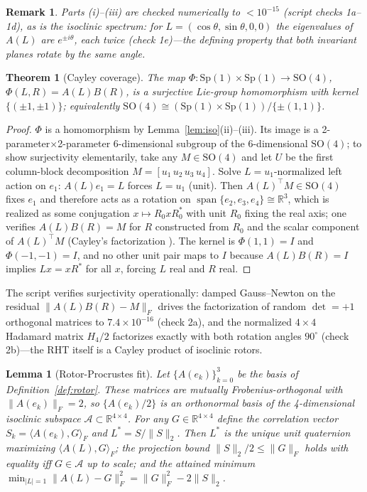 \documentclass{article}
\newtheorem{theorem}{Theorem}
\newtheorem{lemma}{Lemma}
\newtheorem{remark}{Remark}
\newcommand{\R}{\mathbb{R}}
\newcommand{\SO}{\mathrm{SO}}
\newcommand{\Sp}{\mathrm{Sp}}
\newcommand{\norm}[1]{\lVert #1 \rVert}
\newcommand{\inner}[2]{\langle #1, #2 \rangle}
\begin{document}
\begin{remark}
Parts (i)--(iii) are checked numerically to $<10^{-15}$ (script checks 1a--1d),
as is the isoclinic spectrum: for $L=(\cos\theta,\sin\theta,0,0)$ the
eigenvalues of $A(L)$ are $e^{\pm i\theta}$, each twice (check 1e)---the
defining property that both invariant planes rotate by the same angle.
\end{remark}

\begin{theorem}[Cayley coverage]
\label{thm:cayley}
The map $\Phi:\Sp(1)\times\Sp(1)\to\SO(4)$, $\Phi(L,R)=A(L)B(R)$, is a
surjective Lie-group homomorphism with kernel $\{(\pm1,\pm1)\}$; equivalently
$\SO(4)\cong(\Sp(1)\times\Sp(1))/\{\pm(1,1)\}$.
\end{theorem}

\begin{proof}
$\Phi$ is a homomorphism by Lemma~\ref{lem:iso}(ii)--(iii). Its image is a
2-parameter$\times$2-parameter 6-dimensional subgroup of the 6-dimensional
$\SO(4)$; to show surjectivity elementarily, take any $M\in\SO(4)$ and let $U$
be the first column-block decomposition $M=[u_1\,u_2\,u_3\,u_4]$. Solve
$L=u_1$-normalized left action on $e_1$: $A(L)e_1=L$ forces $L=u_1$ (unit).
Then $A(L)^\top M\in\SO(4)$ fixes $e_1$ and therefore acts as a rotation on
$\operatorname{span}\{e_2,e_3,e_4\}\cong\R^3$, which is realized as some
conjugation $x\mapsto R_0xR_0^{*}$ with unit $R_0$ fixing the real axis;
one verifies $A(L)B(R)=M$ for $R$ constructed from $R_0$ and the scalar
component of $A(L)^\top M$ (Cayley's factorization
\citep{thomas2015cayley}). The kernel is $\Phi(1,1)=I$ and
$\Phi(-1,-1)=I$, and no other unit pair maps to $I$ because
$A(L)B(R)=I$ implies $Lx=xR^{*}$ for all $x$, forcing $L$ real and $R$ real.
\end{proof}

The script verifies surjectivity operationally: damped Gauss--Newton on the
residual $\|A(L)B(R)-M\|_F$ drives the factorization of random
$\det=+1$ orthogonal matrices to $7.4\times10^{-16}$ (check 2a), and the
normalized $4\times4$ Hadamard matrix $H_4/2$ factorizes exactly with both
rotation angles $90^\circ$ (check 2b)---the RHT itself is a Cayley product of
isoclinic rotors.

\begin{lemma}[Rotor-Procrustes fit]
\label{lem:proc}
Let $\{A(e_k)\}_{k=0}^3$ be the basis of Definition~\ref{def:rotor}. These
matrices are mutually Frobenius-orthogonal with $\|A(e_k)\|_F=2$, so
$\{A(e_k)/2\}$ is an orthonormal basis of the 4-dimensional isoclinic subspace
$\mathcal{A}\subset\R^{4\times4}$. For any $G\in\R^{4\times4}$ define the
correlation vector $S_k=\inner{A(e_k)}{G}_F$ and
$L^{*}=S/\norm{S}_2$. Then $L^{*}$ is the unique unit quaternion maximizing
$\inner{A(L)}{G}_F$; the projection bound $\norm{S}_2/2\le\norm{G}_F$ holds
with equality iff $G\in\mathcal{A}$ up to scale; and the attained minimum
$\min_{|L|=1}\norm{A(L)-G}_F^2=\norm{G}_F^2-2\norm{S}_2$.
\end{lemma}
\end{document}
